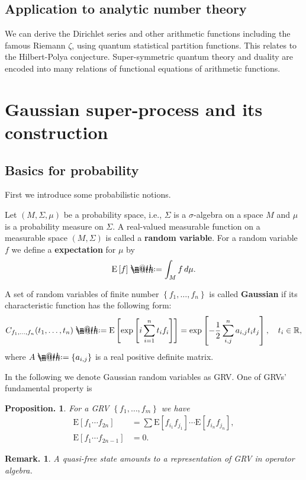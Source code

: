 \documentclass[openany, a4paper, oneside]{jsbook}
\makeatletter
\newcommand*{\defeq}{\mathrel{\rlap{%
\raisebox{0.3ex}{$\m@th\cdot$}}%
\raisebox{-0.3ex}{$\m@th\cdot$}}%
=}
\theoremstyle{break}
\theoremstyle{breakdefn}
\newtheorem{prop}[thm]{Proposition.}
\newtheorem{rem}[thm]{Remark.}
\newcommand{\sqbk}[1]{\left[#1\right]}
\newcommand{\cbk}[1]{\left\{#1\right\}}
\newcommand{\bbR}{\mathbb{R}}
\newcommand{\E}[1]{\rmE\sqbk{#1}}
\newcommand{\rmE}{\mathrm{E}}
\makeatother
\begin{document}
\subsection{Application to analytic number theory \cite{AsaoArai17}}


We can derive the Dirichlet series and other arithmetic functions including the famous Riemann $\zeta$,
using quantum statistical partition functions.
This relates to the Hilbert-Polya conjecture.
Super-symmetric quantum theory and duality are encoded into many relations of functional equations of arithmetic functions.
\section{Gaussian super-process and its construction}

\subsection{Basics for probability}


First we introduce some probabilistic notions.

Let $(M, \Sigma, \mu)$ be a probability space, i.e.,
$\Sigma$ is a $\sigma$-algebra on a space $M$ and $\mu$ is a probability measure on $\Sigma$.
A real-valued measurable function on a measurable space $(M, \Sigma)$ is called a \textbf{random variable}.
For a random variable $f$ we define a \textbf{expectation} for $\mu$ by
\begin{align}
 \E{f} \defeq \int_M f \, d \mu.
\end{align}

A set of random variables of finite number $\cbk{f_1, \dots, f_n}$ is called \textbf{Gaussian}
if its characteristic function has the following form:
\begin{align}
 C_{f_1, \dots, f_n} (t_1, \dots, t_n)
 \defeq
 \E{\exp \sqbk{i \sum_{i=1}^n t_i f_i}}
 =
 \exp \sqbk{- \frac{1}{2} \sum_{i,j}^{n} a_{i,j} t_i t_j}, \quad t_i \in \bbR,
\end{align}
where $A \defeq \cbk{a_{i,j}}$ is a real positive definite matrix.

In the following we denote Gaussian random variables as GRV.
One of GRVs' fundamental property is
\begin{prop}
 For a GRV $\cbk{f_1, \dots, f_m}$ we have
 \begin{align}
  \E{f_1 \cdots f_{2n}}
  &=
  \sum \E{f_{i_1} f_{j_1}}  \cdots \E{f_{i_n} f_{j_n}}, \\
  \E{f_1 \cdots f_{2n-1}}
  &= 0.
 \end{align}
\end{prop}
\begin{rem}
 A quasi-free state amounts to a representation of GRV in operator algebra.
\end{rem}
\end{document}
